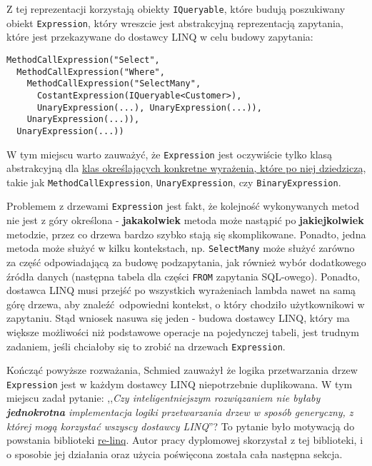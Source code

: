 Z tej reprezentacji korzystają obiekty \texttt{IQueryable}, które budują poszukiwany obiekt \texttt{Expression}, który wreszcie jest abstrakcyjną reprezentacją zapytania, które jest przekazywane do dostawcy LINQ w celu budowy zapytania:

\begin{lstlisting}
MethodCallExpression("Select",
  MethodCallExpression("Where",
    MethodCallExpression("SelectMany",
      CostantExpression(IQueryable<Customer>),
      UnaryExpression(...), UnaryExpression(...)),
    UnaryExpression(...)),
  UnaryExpression(...))
\end{lstlisting}

W tym miejscu warto zauważyć, że \texttt{Expression} jest oczywiście tylko klasą abstrakcyjną dla \href{https://msdn.microsoft.com/en-us/library/system.linq.expressions.expression(v=vs.110).aspx}{klas określających konkretne wyrażenia, które po niej dziedziczą}, takie jak \texttt{MethodCallExpression}, \texttt{UnaryExpression}, czy \texttt{BinaryExpression}.

Problemem z drzewami \texttt{Expression} jest fakt, że kolejność wykonywanych metod nie jest z góry określona - \textbf{jakakolwiek} metoda może nastąpić po \textbf{jakiejkolwiek} metodzie, przez co drzewa bardzo szybko stają się skomplikowane. Ponadto, jedna metoda może służyć w kilku kontekstach, np. \texttt{SelectMany} może służyć zarówno za część odpowiadającą za budowę podzapytania, jak również wybór dodatkowego źródła danych (następna tabela dla części \texttt{FROM} zapytania SQL-owego). Ponadto, dostawca LINQ musi przejść po wszystkich wyrażeniach lambda nawet na samą górę drzewa, aby znaleźć odpowiedni kontekst, o który chodziło użytkownikowi w zapytaniu. Stąd wniosek nasuwa się jeden - budowa dostawcy LINQ, który ma większe możliwości niż podstawowe operacje na pojedynczej tabeli, jest trudnym zadaniem, jeśli chciałoby się to zrobić na drzewach \texttt{Expression}.

Kończąć powyższe rozważania, Schmied zauważył że logika przetwarzania drzew \texttt{Expression} jest w każdym dostawcy LINQ niepotrzebnie duplikowana. W tym miejscu zadał pytanie: ,,\textit{Czy inteligentniejszym rozwiązaniem nie byłaby \textbf{jednokrotna} implementacja logiki przetwarzania drzew w sposób generyczny, z której mogą korzystać wszyscy dostawcy LINQ}''? To pytanie było motywacją do powstania biblioteki \href{https://github.com/re-motion/Relinq}{re-linq}. Autor pracy dyplomowej skorzystał z tej biblioteki, i o sposobie jej działania oraz użycia poświęcona została cała następna sekcja. 

